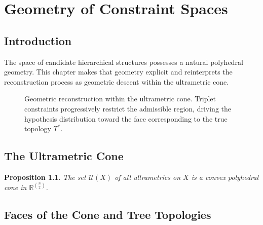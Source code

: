 \documentclass[12pt,a4paper,oneside]{book}
\numberwithin{equation}{chapter}
\theoremstyle{plain}
\newtheorem{proposition}[theorem]{Proposition}
\theoremstyle{definition}
\theoremstyle{remark}
\begin{document}

\chapter{Geometry of Constraint Spaces}
\label{ch:constraint-geometry}

\section{Introduction}

The space of candidate hierarchical structures possesses a natural
polyhedral geometry. This chapter makes that geometry explicit and
reinterprets the reconstruction process as geometric descent within
the ultrametric cone.

\begin{figure}[htbp]
\centering
{}
\caption{Geometric reconstruction within the ultrametric cone.
Triplet constraints progressively restrict the admissible region,
driving the hypothesis distribution toward the face corresponding
to the true topology $T^\ast$.}
\label{fig:ultrametric-cone-descent}
\end{figure}

\section{The Ultrametric Cone}

\begin{proposition}
The set $\mathcal{U}(X)$ of all ultrametrics on $X$ is a convex
polyhedral cone in $\mathbb{R}^{\binom{n}{2}}$.
\end{proposition}

\section{Faces of the Cone and Tree Topologies}
\end{document}
